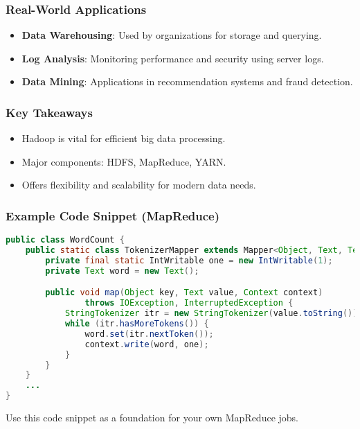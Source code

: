 \documentclass[aspectratio=169]{beamer}
\begin{document}
\begin{frame}[fragile]
    \frametitle{Real-World Applications}

    \begin{itemize}
        \item \textbf{Data Warehousing}: Used by organizations for storage and querying.
        \item \textbf{Log Analysis}: Monitoring performance and security using server logs.
        \item \textbf{Data Mining}: Applications in recommendation systems and fraud detection.
    \end{itemize}
\end{frame}

\begin{frame}[fragile]
    \frametitle{Key Takeaways}

    \begin{itemize}
        \item Hadoop is vital for efficient big data processing.
        \item Major components: HDFS, MapReduce, YARN.
        \item Offers flexibility and scalability for modern data needs.
    \end{itemize}
\end{frame}

\begin{frame}[fragile]
    \frametitle{Example Code Snippet (MapReduce)}

    \begin{lstlisting}[language=Java]
public class WordCount {
    public static class TokenizerMapper extends Mapper<Object, Text, Text, IntWritable> {
        private final static IntWritable one = new IntWritable(1);
        private Text word = new Text();

        public void map(Object key, Text value, Context context) 
                throws IOException, InterruptedException {
            StringTokenizer itr = new StringTokenizer(value.toString());
            while (itr.hasMoreTokens()) {
                word.set(itr.nextToken());
                context.write(word, one);
            }
        }
    }
    ...
}
    \end{lstlisting}

    Use this code snippet as a foundation for your own MapReduce jobs.
\end{frame}
\end{document}
